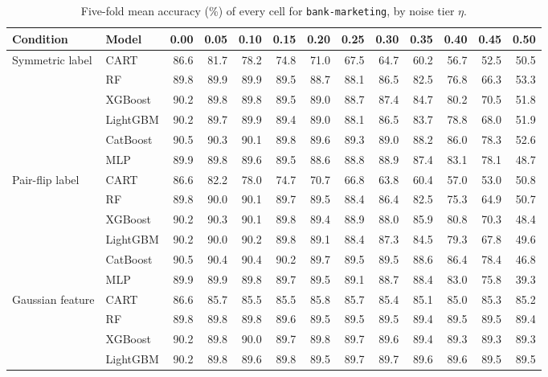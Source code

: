\begin{table}[p]
\centering
\tiny
\setlength{\tabcolsep}{2.6pt}
\caption{Five-fold mean accuracy (\%) of every cell for \texttt{bank-marketing}, by noise tier $\eta$.}
\label{tab:grid_bank_marketing}
\begin{tabular}{@{}llrrrrrrrrrrr@{}}
\toprule
Condition & Model & 0.00 & 0.05 & 0.10 & 0.15 & 0.20 & 0.25 & 0.30 & 0.35 & 0.40 & 0.45 & 0.50 \\
\midrule
Symmetric label & CART & 86.6 & 81.7 & 78.2 & 74.8 & 71.0 & 67.5 & 64.7 & 60.2 & 56.7 & 52.5 & 50.5 \\
 & RF & 89.8 & 89.9 & 89.9 & 89.5 & 88.7 & 88.1 & 86.5 & 82.5 & 76.8 & 66.3 & 53.3 \\
 & XGBoost & 90.2 & 89.8 & 89.8 & 89.5 & 89.0 & 88.7 & 87.4 & 84.7 & 80.2 & 70.5 & 51.8 \\
 & LightGBM & 90.2 & 89.7 & 89.9 & 89.4 & 89.0 & 88.1 & 86.5 & 83.7 & 78.8 & 68.0 & 51.9 \\
 & CatBoost & 90.5 & 90.3 & 90.1 & 89.8 & 89.6 & 89.3 & 89.0 & 88.2 & 86.0 & 78.3 & 52.6 \\
 & MLP & 89.9 & 89.8 & 89.6 & 89.5 & 88.6 & 88.8 & 88.9 & 87.4 & 83.1 & 78.1 & 48.7 \\
\midrule
Pair-flip label & CART & 86.6 & 82.2 & 78.0 & 74.7 & 70.7 & 66.8 & 63.8 & 60.4 & 57.0 & 53.0 & 50.8 \\
 & RF & 89.8 & 90.0 & 90.1 & 89.7 & 89.5 & 88.4 & 86.4 & 82.5 & 75.3 & 64.9 & 50.7 \\
 & XGBoost & 90.2 & 90.3 & 90.1 & 89.8 & 89.4 & 88.9 & 88.0 & 85.9 & 80.8 & 70.3 & 48.4 \\
 & LightGBM & 90.2 & 90.0 & 90.2 & 89.8 & 89.1 & 88.4 & 87.3 & 84.5 & 79.3 & 67.8 & 49.6 \\
 & CatBoost & 90.5 & 90.4 & 90.4 & 90.2 & 89.7 & 89.5 & 89.5 & 88.6 & 86.4 & 78.4 & 46.8 \\
 & MLP & 89.9 & 89.9 & 89.8 & 89.7 & 89.5 & 89.1 & 88.7 & 88.4 & 83.0 & 75.8 & 39.3 \\
\midrule
Gaussian feature & CART & 86.6 & 85.7 & 85.5 & 85.5 & 85.8 & 85.7 & 85.4 & 85.1 & 85.0 & 85.3 & 85.2 \\
 & RF & 89.8 & 89.8 & 89.8 & 89.6 & 89.5 & 89.5 & 89.5 & 89.4 & 89.5 & 89.5 & 89.4 \\
 & XGBoost & 90.2 & 89.8 & 90.0 & 89.7 & 89.8 & 89.7 & 89.6 & 89.4 & 89.3 & 89.3 & 89.3 \\
 & LightGBM & 90.2 & 89.8 & 89.6 & 89.8 & 89.5 & 89.7 & 89.7 & 89.6 & 89.6 & 89.5 & 89.5 \\

\end{tabular}
\end{table}
